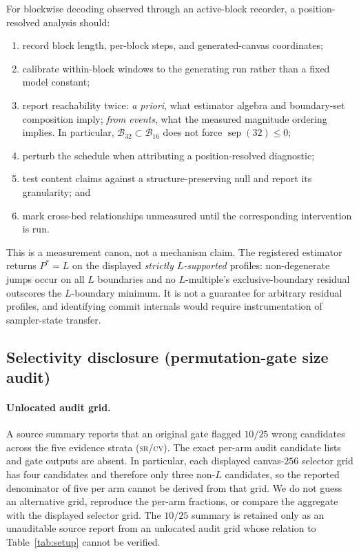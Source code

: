 \documentclass{article}
\newcommand{\srcv}{\textsc{sr/cv}}
\begin{document}
For blockwise decoding observed through an active-block recorder, a
position-resolved analysis should:
\begin{enumerate}
  \item record block length, per-block steps, and generated-canvas coordinates;
  \item calibrate within-block windows to the generating run rather than a fixed
  model constant;
  \item report reachability twice: \emph{a priori}, what estimator algebra and
  boundary-set composition imply; \emph{from events}, what the measured magnitude
  ordering implies. In particular,
  $\mathcal B_{32}\subset\mathcal B_{16}$ does not force
  $\operatorname{sep}(32)\le0$;
  \item perturb the schedule when attributing a position-resolved diagnostic;
  \item test content claims against a structure-preserving null and report its
  granularity; and
  \item mark cross-bed relationships unmeasured until the corresponding
  intervention is run.
\end{enumerate}
This is a measurement canon, not a mechanism claim. The registered estimator
returns $P^*=L$ on the displayed \emph{strictly $L$-supported} profiles:
non-degenerate jumps occur on all $L$ boundaries and no $L$-multiple's
exclusive-boundary residual outscores the $L$-boundary minimum. It is not a
guarantee for arbitrary residual profiles, and identifying commit internals would
require instrumentation of sampler-state transfer.

\subsection{Selectivity disclosure (permutation-gate size audit)}
\label{sec:selectivity-audit}

\paragraph{Unlocated audit grid.}
A source summary reports that an original gate flagged $10/25$ wrong candidates
across the five evidence strata (\srcv).  The exact per-arm audit candidate lists
and gate outputs are absent.  In particular, each displayed canvas-$256$ selector
grid has four candidates and therefore only three non-$L$ candidates, so the
reported denominator of five per arm cannot be derived from that grid.  We do
not guess an alternative grid, reproduce the per-arm fractions, or compare the
aggregate with the displayed selector grid.  The $10/25$ summary is retained
only as an unauditable source report from an unlocated audit grid whose relation
to Table~\ref{tab:setup} cannot be verified.
\end{document}

